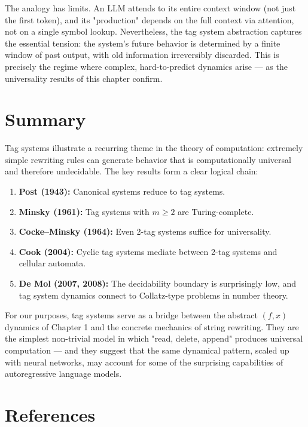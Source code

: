The analogy has limits. An LLM attends to its entire context window (not just the first token), and its "production" depends on the full context via attention, not on a single symbol lookup. Nevertheless, the tag system abstraction captures the essential tension: the system's future behavior is determined by a finite window of past output, with old information irreversibly discarded. This is precisely the regime where complex, hard-to-predict dynamics arise --- as the universality results of this chapter confirm.

\section{Summary}

Tag systems illustrate a recurring theme in the theory of computation: extremely simple rewriting rules can generate behavior that is computationally universal and therefore undecidable. The key results form a clear logical chain:

\begin{enumerate}
\item \textbf{Post (1943):} Canonical systems reduce to tag systems.
\item \textbf{Minsky (1961):} Tag systems with $m \geq 2$ are Turing-complete.
\item \textbf{Cocke--Minsky (1964):} Even 2-tag systems suffice for universality.
\item \textbf{Cook (2004):} Cyclic tag systems mediate between 2-tag systems and cellular automata.
\item \textbf{De Mol (2007, 2008):} The decidability boundary is surprisingly low, and tag system dynamics connect to Collatz-type problems in number theory.
\end{enumerate}

For our purposes, tag systems serve as a bridge between the abstract $(f, x)$ dynamics of Chapter 1 and the concrete mechanics of string rewriting. They are the simplest non-trivial model in which "read, delete, append" produces universal computation --- and they suggest that the same dynamical pattern, scaled up with neural networks, may account for some of the surprising capabilities of autoregressive language models.

\section{References}


